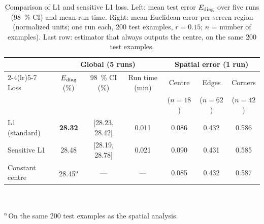 \begin{table}[htbp]
  \centering
  \caption[Comparison of L1 and sensitive L1 loss]{Comparison of L1 and sensitive L1 loss. Left: mean test error
           $E_{\mathrm{diag}}$ over five runs (\SI{98}{\percent} CI) and
           mean run time. Right: mean Euclidean error per screen region
           (normalized units; one run each, 200 test examples, $r=0.15$; $n$ =
           number of examples). Last row: estimator that always outputs the
           centre, on the same 200 test examples.}
  \label{tab:loss}
  \small
  \setlength{\tabcolsep}{4.5pt}
  \begin{tabular}{lccc@{\hspace{1.2em}}ccc}
    \toprule
    & \multicolumn{3}{c}{Global (5 runs)} & \multicolumn{3}{c}{Spatial error (1 run)} \\
    \cmidrule(lr){2-4}\cmidrule(lr){5-7}
    Loss & $E_{\mathrm{diag}}$ (\%) & \SI{98}{\percent} CI (\%) & Run time (min)
         & Centre & Edges & Corners \\
         &               &                           &
         & ($n=18$) & ($n=62$) & ($n=42$) \\
    \midrule
    L1 (standard)\sel{}    & \textbf{28.32} & [28.23, 28.42] & 0.011 & 0.086 & 0.432 & 0.586 \\
    Sensitive L1           & 28.48 & [28.19, 28.78] & 0.021 & 0.090 & 0.431 & 0.585 \\
    \midrule
    Constant centre        & 28.45\textsuperscript{a} & --- & --- & 0.085 & 0.432 & 0.587 \\
    \bottomrule
  \end{tabular}\\[1mm]
  \parbox{0.95\linewidth}{\footnotesize \textsuperscript{a}\,On the same 200 test
  examples as the spatial analysis.}
\end{table}

